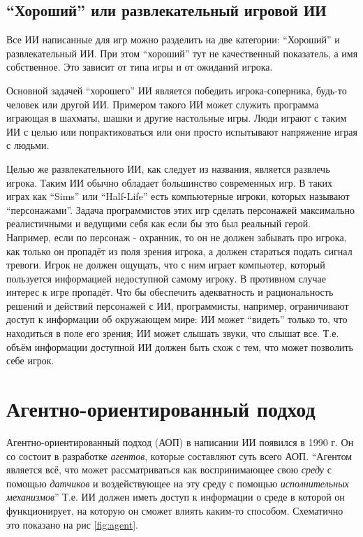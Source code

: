 \documentclass[12pt]{report}
\begin{document}
\subsection{``Хороший'' или развлекательный игровой ИИ}
Все ИИ написанные для игр можно разделить на две категории: ``Хороший'' и развлекательный ИИ.\citep{PlayingToLose} При этом ``хороший'' тут не качественный показатель, а имя собственное. Это зависит от типа игры и от ожиданий игрока.

Основной задачей ``хорошего'' ИИ является победить игрока-соперника, будь-то человек или другой ИИ. Примером такого ИИ может служить программа играющая в шахматы, шашки и другие настольные игры. Люди играют с таким ИИ с целью или попрактиковаться или они просто испытывают напряжение играя с людьми. \citep{PlayingToLose}

Целью же развлекательного ИИ, как следует из названия, является развлечь игрока. Таким ИИ обычно обладает большинство современных игр. В таких играх как ``Sims'' или ``Half-Life'' есть компьютерные игроки, которых называют ``персонажами''. Задача программистов этих игр  сделать персонажей максимально реалистичными и ведущими себя как если бы это был реальный герой. Например, если по персонаж - охранник, то он не должен забывать про игрока, как только он пропадёт из поля зрения игрока, а должен стараться подать сигнал тревоги. Игрок не должен ощущать, что с ним играет компьютер, который пользуется информацией недоступной самому игроку. В противном случае интерес к игре  пропадёт. Что бы обеспечить адекватность и рациональность решений и действий персонажей с ИИ, программисты, например, ограничивают доступ к информации об окружающем мире: ИИ может ``видеть'' только то, что находиться в поле его зрения; ИИ может слышать звуки, что слышат все. Т.е. объём информации доступной ИИ должен быть схож с тем, что может позволить себе игрок. \citep{buckland2005}



\section{Агентно-ориентированный подход}
Агентно-ориентированный подход (АОП) в написании ИИ появился в 1990 г. Он со состоит в разработке \emph{агентов}, которые составляют суть всего АОП. ``Агентом является всё, что может рассматриваться как воспринимающее свою \emph{среду} с помощью \emph{датчиков} и воздействующее на эту среду с помощью \emph{исполнительных механизмов}'' \citep{russell1995} Т.е. ИИ должен иметь доступ к информации о среде в которой он функционирует, на которую он сможет влиять каким-то способом. Схематично это показано на рис \ref{fig:agent}.
\end{document}

